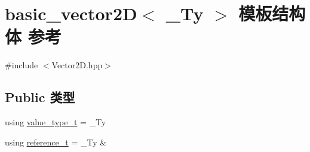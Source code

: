 \hypertarget{structbasic__vector2_d}{}\section{basic\+\_\+vector2D$<$ \+\_\+\+Ty $>$ 模板结构体 参考}
\label{structbasic__vector2_d}


{\ttfamily \#include $<$Vector2\+D.\+hpp$>$}

\subsection*{Public 类型}
\begin{DoxyCompactItemize}
\item 
using \hyperlink{structbasic__vector2_d_a3a8e15c6a773a34b04090604c981e63e}{value\+\_\+type\+\_\+t} = \+\_\+\+Ty
\item 
using \hyperlink{structbasic__vector2_d_afa9c650d6178f708c88f7abab001c4a3}{reference\+\_\+t} = \+\_\+\+Ty \&
\end{DoxyCompactItemize}
